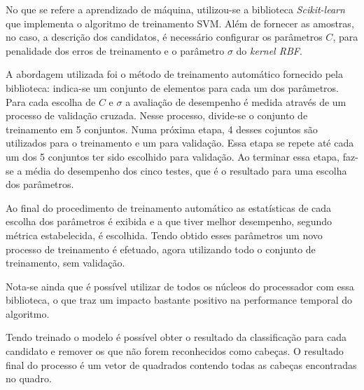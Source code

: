 No que se refere a aprendizado de máquina, utilizou-se a biblioteca \textit{Scikit-learn} \cite{scikit-learn} que implementa o algoritmo de treinamento SVM. Além de fornecer as amostras, no caso, a descrição dos candidatos, é necessário configurar os parâmetros $C$, para penalidade dos erros de treinamento e o parâmetro $\sigma$ do \textit{kernel RBF}. 

A abordagem utilizada foi o método de treinamento automático fornecido pela biblioteca: indica-se um conjunto de elementos para cada um dos parâmetros. Para cada escolha de $C$ e $\sigma$ a avaliação de desempenho é medida através de um processo de validação cruzada. Nesse processo, divide-se o conjunto de treinamento em 5 conjuntos. Numa próxima etapa, 4 desses cojuntos são utilizados para o treinamento e um para validação. Essa etapa se repete até cada um dos 5 conjuntos ter sido escolhido para validação. Ao terminar essa etapa, faz-se a média do desempenho dos cinco testes, que é o resultado para uma escolha dos parâmetros.

Ao final do procedimento de treinamento automático as estatísticas de cada escolha dos parâmetros é exibida e a que tiver melhor desempenho, segundo métrica estabelecida, é escolhida. Tendo obtido esses parâmetros um novo processo de treinamento é efetuado, agora utilizando todo o conjunto de treinamento, sem validação.

Nota-se ainda que é possível utilizar de todos os núcleos do processador com essa biblioteca, o que traz um impacto bastante positivo na performance temporal do algoritmo.

Tendo treinado o modelo é possível obter o resultado da classificação para cada candidato e remover os que não forem reconhecidos como cabeças. O resultado final do processo é um vetor de quadrados contendo todas as cabeças encontradas no quadro.
